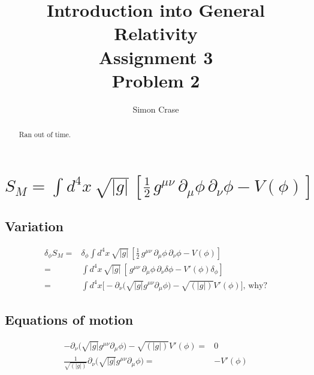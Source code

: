 \documentclass[]{article}
\title{Introduction into General Relativity\\Assignment 3\\Problem 2}
\author{Simon Crase}
\begin{document}
\maketitle
\thispagestyle{fancy}

\begin{abstract}
Ran out of time.
\end{abstract}


 

\section{$S_M = \int d^4x \, \sqrt{|g|} \, \left[\frac12 \, g^{\mu\nu} \, \partial_\mu \phi \, \partial_\nu \phi - V(\phi)\right]$}
\subsection{Variation}
\begin{align*}
\delta_{\phi} S_M =& \delta_{\phi} \int d^4x \, \sqrt{|g|} \, \left[\frac{1}{2} \, g^{\mu\nu} \, \partial_\mu \phi \, \partial_\nu \phi - V(\phi)\right]\\
=&  \int d^4x \, \sqrt{|g|} \, \left[ \, g^{\mu\nu} \, \partial_\mu \phi \, \partial_\nu \delta \phi - V'(\phi) \delta_{\phi} \right]\\
=& \int d^4x \big[ -\partial_\nu \big(\sqrt{|g|} g^{\mu\nu} \partial_\mu \phi\big) - \sqrt{(|g|)} V'(\phi)\big] \text{, why?}
\end{align*}
\subsection{Equations of motion}
\begin{align*}
-\partial_\nu \big(\sqrt{|g|} g^{\mu\nu} \partial_\mu \phi\big) - \sqrt{(|g|)} V'(\phi)=&0\\
\frac{1}{\sqrt{(|g|)}} \partial_\nu \big(\sqrt{|g|} g^{\mu\nu} \partial_\mu \phi\big) =& -  V'(\phi)
\end{align*}
\end{document}
